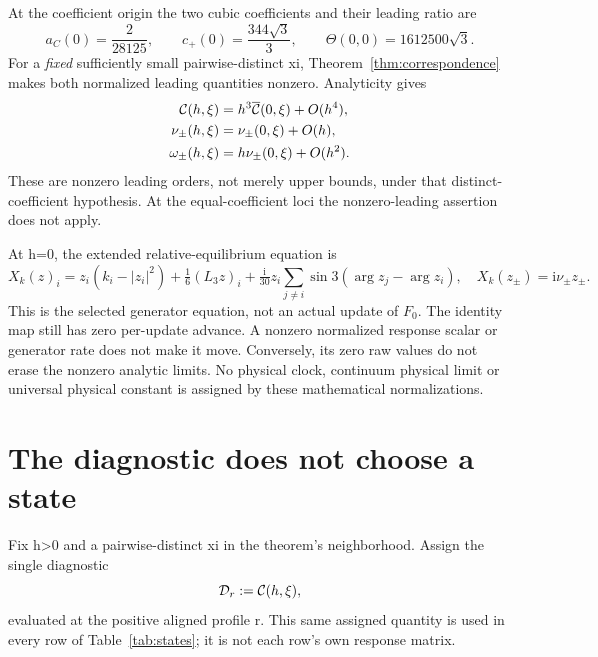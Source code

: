 \documentclass[11pt,a4paper]{article}
\numberwithin{equation}{section}
\theoremstyle{remark}\newtheorem{remark}[theorem]{Remark}
\newcommand{\iu}{\mathrm i}\newcommand{\Id}{I}\newcommand{\Argz}{\operatorname{Arg}_0}
\begin{document}
At the coefficient origin the two cubic coefficients and their leading ratio are
\begin{equation}
a_C(0)=\frac2{28125},\qquad c_+(0)=\frac{344\sqrt3}{3},
\qquad \Theta(0,0)=1612500\sqrt3.
\label{eq:hzero-values}
\end{equation}
For a \emph{fixed} sufficiently small pairwise-distinct xi, Theorem~\ref{thm:correspondence} makes both normalized leading quantities nonzero. Analyticity gives
\begin{align}
\mathcal C(h,\xi)&=h^3\overline{\mathcal C}(0,\xi)+O(h^4),\label{eq:C-scaling}\\
\nu_\pm(h,\xi)&=\nu_\pm(0,\xi)+O(h),\label{eq:nu-scaling}\\
\omega_\pm(h,\xi)&=h\nu_\pm(0,\xi)+O(h^2).\label{eq:omega-scaling}
\end{align}
These are nonzero leading orders, not merely upper bounds, under that distinct-coefficient hypothesis. At the equal-coefficient loci the nonzero-leading assertion does not apply.

At h=0, the extended relative-equilibrium equation is
\begin{equation}
X_k(z)_i=z_i(k_i-|z_i|^2)+\tfrac16(L_3z)_i
+\tfrac{\iu}{30}z_i\sum_{j\ne i}\sin3(\arg z_j-\arg z_i),
\quad X_k(z_\pm)=\iu\nu_\pm z_\pm.
\label{eq:generator-state}
\end{equation}
This is the selected generator equation, not an actual update of $F_0$. The identity map still has zero per-update advance. A nonzero normalized response scalar or generator rate does not make it move. Conversely, its zero raw values do not erase the nonzero analytic limits. No physical clock, continuum physical limit or universal physical constant is assigned by these mathematical normalizations.

\clearpage
\section{The diagnostic does not choose a state}\label{sec:selection}
Fix h>0 and a pairwise-distinct xi in the theorem's neighborhood. Assign the single diagnostic
\begin{equation}
\mathcal D_r:=\mathcal C(h,\xi),
\label{eq:assigned}
\end{equation}
evaluated at the positive aligned profile r. This same assigned quantity is used in every row of Table~\ref{tab:states}; it is not each row's own response matrix.
\end{document}
